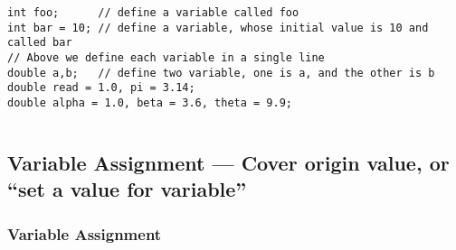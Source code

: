 \documentclass[
  11pt, %
  xcolor=dvipsnames
]{beamer}
\begin{document}
\begin{frame}[fragile]
\begin{columns}[c]
\begin{column}{0.9\textwidth}
			\begin{lstlisting}
int foo;      // define a variable called foo
int bar = 10; // define a variable, whose initial value is 10 and called bar
// Above we define each variable in a single line
double a,b;   // define two variable, one is a, and the other is b
double read = 1.0, pi = 3.14;
double alpha = 1.0, beta = 3.6, theta = 9.9;
      \end{lstlisting}

		\end{column}
	\end{columns}

\end{frame}

\subsection{Variable Assignment --- Cover origin value, or ``set a value for variable''}
\begin{frame}
	\frametitle{Variable Assignment}


	\begin{columns}[c]
		\begin{column}{0.9\textwidth}


		\end{column}
	\end{columns}

\end{frame}
\end{document}
